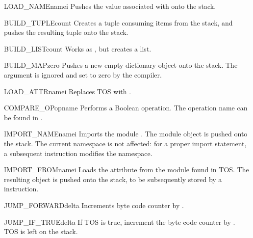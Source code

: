 \begin{opcodedesc}{LOAD_NAME}{namei}
Pushes the value associated with  onto the stack.
\end{opcodedesc}

\begin{opcodedesc}{BUILD_TUPLE}{count}
Creates a tuple consuming  items from the stack, and pushes
the resulting tuple onto the stack.
\end{opcodedesc}

\begin{opcodedesc}{BUILD_LIST}{count}
Works as , but creates a list.
\end{opcodedesc}

\begin{opcodedesc}{BUILD_MAP}{zero}
Pushes a new empty dictionary object onto the stack.  The argument is
ignored and set to zero by the compiler.
\end{opcodedesc}

\begin{opcodedesc}{LOAD_ATTR}{namei}
Replaces TOS with .
\end{opcodedesc}

\begin{opcodedesc}{COMPARE_OP}{opname}
Performs a Boolean operation.  The operation name can be found
in .
\end{opcodedesc}

\begin{opcodedesc}{IMPORT_NAME}{namei}
Imports the module .  The module object is
pushed onto the stack.  The current namespace is not affected: for a
proper import statement, a subsequent  instruction
modifies the namespace.
\end{opcodedesc}

\begin{opcodedesc}{IMPORT_FROM}{namei}
Loads the attribute  from the module found in
TOS. The resulting object is pushed onto the stack, to be subsequently
stored by a  instruction.
\end{opcodedesc}

\begin{opcodedesc}{JUMP_FORWARD}{delta}
Increments byte code counter by .
\end{opcodedesc}

\begin{opcodedesc}{JUMP_IF_TRUE}{delta}
If TOS is true, increment the byte code counter by .  TOS is
left on the stack.
\end{opcodedesc}

